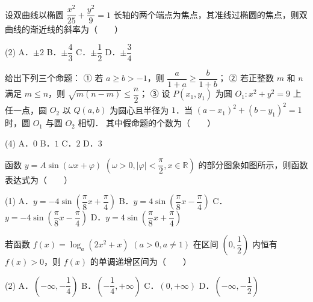 \begin{question}
设双曲线以椭圆 $\dfrac{x^2}{25} + \dfrac{y^2}{9} = 1$ 长轴的两个端点为焦点，其准线过椭圆的焦点，则双曲线的渐近线的斜率为\mbox{（　　）}

\begin{gkopts}(2)
\task A．$\pm 2$
\task B．$\pm \dfrac{4}{3}$
\task C．$\pm \dfrac{1}{2}$
\task D．$\pm \dfrac{3}{4}$
\end{gkopts}

\end{question}
\begin{question}
给出下列三个命题：
① 若 $a \geqslant b > -1$，则 $\dfrac{a}{1+a} \geqslant \dfrac{b}{1+b}$；
② 若正整数 $m$ 和 $n$ 满足 $m \leqslant n$，则 $\sqrt{m(n-m)} \leqslant \dfrac{n}{2}$；
③ 设 $P(x_1, y_1)$ 为圆 $O_1 : x^2 + y^2 = 9$ 上任一点，圆 $O_2$ 以 $Q(a, b)$ 为圆心且半径为 $1$．当 $(a - x_1)^2 + (b - y_1)^2 = 1$ 时，圆 $O_1$ 与圆 $O_2$ 相切．
其中假命题的个数为\mbox{（　　）}

\begin{gkopts}(4)
\task A．$0$
\task B．$1$
\task C．$2$
\task D．$3$
\end{gkopts}

\Needspace{0.4\textheight}
\end{question}
\begin{question}
函数 $y = A\sin(\omega x + \varphi)$ $\left(\omega > 0, |\varphi| < \dfrac{\pi}{2}, x \in \mathbb{R}\right)$ 的部分图象如图所示，则函数表达式为\mbox{（　　）}
\nopagebreak[4]
\begin{center}\end{center}
\nopagebreak[4]
\begin{gkopts}(1)
\task A．$y = -4\sin\left(\dfrac{\pi}{8}x + \dfrac{\pi}{4}\right)$
\task B．$y = 4\sin\left(\dfrac{\pi}{8}x - \dfrac{\pi}{4}\right)$
\task C．$y = -4\sin\left(\dfrac{\pi}{8}x - \dfrac{\pi}{4}\right)$
\task D．$y = 4\sin\left(\dfrac{\pi}{8}x + \dfrac{\pi}{4}\right)$
\end{gkopts}

\end{question}
\begin{question}
若函数 $f(x) = \log_a(2x^2 + x)$ $(a > 0, a \neq 1)$ 在区间 $\left(0, \dfrac{1}{2}\right)$ 内恒有 $f(x) > 0$，则 $f(x)$ 的单调递增区间为\mbox{（　　）}

\begin{gkopts}(2)
\task A．$\left(-\infty, -\dfrac{1}{4}\right)$
\task B．$\left(-\dfrac{1}{4}, +\infty\right)$
\task C．$(0, +\infty)$
\task D．$\left(-\infty, -\dfrac{1}{2}\right)$
\end{gkopts}

\end{question}
